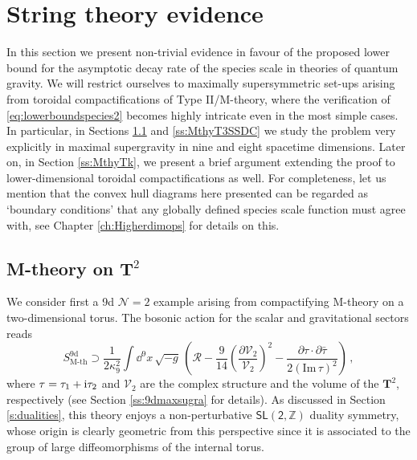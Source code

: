 \section{String theory evidence}
\label{s:examplesbound}

In this section we present non-trivial evidence in favour of the proposed lower bound for the asymptotic decay rate of the species scale in theories of quantum gravity. We will restrict ourselves to maximally supersymmetric set-ups arising from toroidal compactifications of Type II/M-theory, where the verification of \eqref{eq:lowerboundspecies2} becomes highly intricate even in the most simple cases. In particular, in Sections \ref{ss:MthyT2SSDC} and \ref{ss:MthyT3SSDC} we study the problem very explicitly in maximal supergravity in nine and eight spacetime dimensions. Later on, in Section \ref{ss:MthyTk}, we present a brief argument extending the proof to lower-dimensional toroidal compactifications as well. For completeness, let us mention that the convex hull diagrams here presented can be regarded as `boundary conditions' that any globally defined species scale function must agree with, see Chapter \ref{ch:Higherdimops} for details on this. 

\subsection{M-theory on $\mathbf{T}^2$}
\label{ss:MthyT2SSDC}

We consider first a 9d $\mathcal{N}=2$ example arising from compactifying M-theory on a two-dimensional torus. The bosonic action for the scalar and gravitational sectors reads
%
\begin{equation}\label{eq:9d}
	S^{\text{9d}}_{\text{M-th}} \supset \frac{1}{2\kappa_9^2} \int \dd^{9}x\, \sqrt{-g}\,  \left( \mathcal{R} - \frac{9}{14} \left( \frac{\partial \mathcal{V}_2}{\mathcal{V}_2} \right)^2 -\frac{\partial \tau \cdot \partial \bar \tau}{2 \left(\text{Im}\, \tau\right)^2} \right)\, ,
\end{equation}
%
where $\tau=\tau_1+ \text{i} \tau_2$ and $\mathcal{V}_2$ are the complex structure and the volume of the $\mathbf{T}^2$, respectively (see Section \ref{ss:9dmaxsugra} for details). As discussed in Section \ref{s:dualities}, this theory enjoys a non-perturbative $\mathsf{SL(2, \mathbb{Z})}$ duality symmetry, whose origin is clearly geometric from this perspective since it is associated to the group of large diffeomorphisms of the internal torus\cite{Schwarz:1995dk,Aspinwall:1995fw}. 

